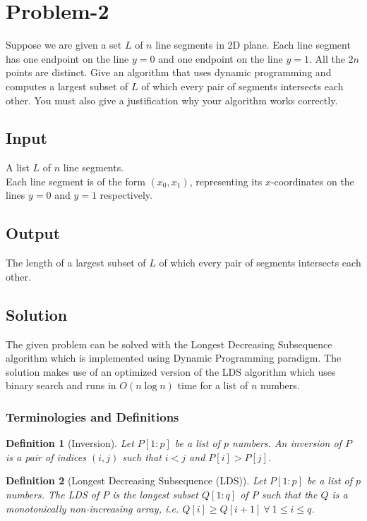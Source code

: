 \documentclass[12pt]{report}
\newtheorem{definition}{Definition}
\begin{document}
    \pagebreak

    \section*{\huge{Problem-2}}
    Suppose we are given a set $L$ of $n$ line segments in 2D plane.
    Each line segment has one endpoint on the line $y = 0$ and one endpoint on the line $y = 1$.
    All the $2n$ points are distinct.
    Give an algorithm that uses dynamic programming and computes a largest subset of $L$ of which every pair of segments intersects each other.
    You must also give a justification why your algorithm works correctly.

    \subsection*{Input}
    A list $L$ of $n$ line segments. \\
    Each line segment is of the form $(x_{0}, x_{1})$, representing its $x$-coordinates on the lines $y = 0$ and $y = 1$ respectively.

    \subsection*{Output}
    The length of a largest subset of $L$ of which every pair of segments intersects each other.

    \subsection*{Solution}
    The given problem can be solved with the Longest Decreasing Subsequence algorithm which is implemented using Dynamic Programming paradigm.
    The solution makes use of an optimized version of the LDS algorithm which uses binary search and runs in $O(n \log{n})$ time for a list of $n$ numbers.

    \subsubsection*{Terminologies and Definitions}
    \begin{definition}[Inversion]
        \label{def:inversion}
        Let $P[1:p]$ be a list of $p$ numbers.
        An inversion of $P$ is a pair of indices $(i, j)$ such that $i < j$ and $P[i] > P[j]$.
    \end{definition}

    \begin{definition}[Longest Decreasing Subsequence (LDS)]
        \label{def:lds}
        Let $P[1:p]$ be a list of $p$ numbers.
        The LDS of $P$ is the longest subset $Q[1:q]$ of $P$ such that the $Q$ is a monotonically non-increasing array, i.e.
        $Q[i] \ge Q[i+1] \ \forall \ 1 \le i \le q$.
    \end{definition}
\end{document}
